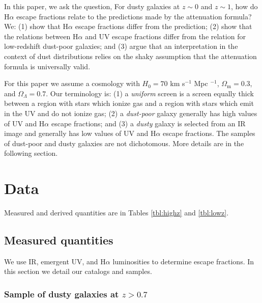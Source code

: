 \documentclass[preprint]{aastex}
\begin{document}
In this paper, we ask the question, For dusty galaxies at $z \sim 0$ and
$z \sim 1$, how do H$\alpha$ escape fractions relate to the predictions made by
the \citet{calzetti00} attenuation formula?  We: (1) show that H$\alpha$
escape fractions differ from
the prediction; (2) show that the relations between H$\alpha$ and UV
escape fractions differ from the relation for low-redshift dust-poor galaxies; and
(3) argue that an interpretation in the context of dust distributions relies on
the shaky assumption that the \citet{calzetti00} attenuation formula is
universally valid.

For this paper we assume a cosmology with $H_{0} = 70$ km s$^{-1}$ Mpc $^{-1}$,
$\Omega_{\mathrm{m}} = 0.3$, and $\Omega_{\Lambda} = 0.7$.  Our terminology
is: (1) a \emph{uniform} screen is a screen equally thick between a region with
stars which ionize gas and a region with stars which emit in the UV and do not
ionize gas; (2) a \emph{dust-poor} galaxy generally has high values of UV and
H$\alpha$ escape fractions; and (3) a \emph{dusty} galaxy is selected from an IR
image and generally has low values of UV and H$\alpha$ escape fractions.  The
samples of dust-poor and dusty galaxies are not
dichotomous.  More details are in the following section.

\section{Data}\label{sec:data}

Measured and derived quantities are in Tables \ref{tbl:highz} and
\ref{tbl:lowz}.

\subsection{Measured quantities}

We use IR, emergent UV, and H$\alpha$ luminosities to determine escape
fractions.  In this section we detail our catalogs and samples.

\subsubsection{Sample of dusty galaxies at $z > 0.7$}
\end{document}
